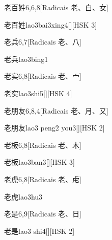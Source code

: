\begin{entry}{老百姓}{6,6,8}[Radicais ⽼、⽩、⼥]
  \begin{phonetics}{老百姓}{lao3bai3xing4}[][HSK 3]
  \end{phonetics}
\end{entry}

\begin{entry}{老兵}{6,7}[Radicais ⽼、⼋]
  \begin{phonetics}{老兵}{lao3bing1}
  \end{phonetics}
\end{entry}

\begin{entry}{老实}{6,8}[Radicais ⽼、⼧]
  \begin{phonetics}{老实}{lao3shi5}[][HSK 4]
  \end{phonetics}
\end{entry}

\begin{entry}{老朋友}{6,8,4}[Radicais ⽼、⽉、⼜]
  \begin{phonetics}{老朋友}{lao3 peng2 you3}[][HSK 2]
  \end{phonetics}
\end{entry}

\begin{entry}{老板}{6,8}[Radicais ⽼、⽊]
  \begin{phonetics}{老板}{lao3ban3}[][HSK 3]
  \end{phonetics}
\end{entry}

\begin{entry}{老虎}{6,8}[Radicais ⽼、⾌]
  \begin{phonetics}{老虎}{lao3hu3}
  \end{phonetics}
\end{entry}

\begin{entry}{老是}{6,9}[Radicais ⽼、⽇]
  \begin{phonetics}{老是}{lao3 shi4}[][HSK 2]
  \end{phonetics}
\end{entry}


